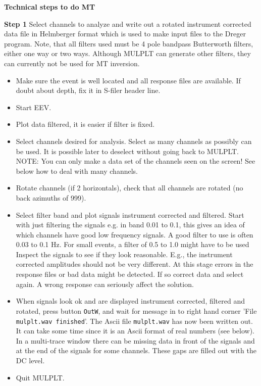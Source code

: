 \textbf{Technical steps to do MT}

\textbf{Step 1} Select channels to analyze and write out a rotated instrument corrected data file in Helmberger format which is used to make input files to the Dreger program. Note, that all filters used must be 4 pole bandpass Butterworth filters, either one way or two ways. Although MULPLT can generate other filters, they can currently not be used for MT inversion. 

\begin{itemize}
\item Make sure the event is well located and all response files are available. If doubt about depth, fix it in S-filer header line.
\item Start EEV.
\item Plot data filtered, it is easier if filter is fixed.
\item Select channels desired for analysis. Select as many channels as possibly can be used. It is possible later to deselect without going back to MULPLT. NOTE:  You can only make a data set of the channels seen on the screen! See below how to deal with many channels.
\item Rotate channels (if 2 horizontals), check that all channels are rotated (no back azimuths of 999).
\item Select filter band and plot signals instrument corrected and filtered. Start with just filtering the signals e.g. in band 0.01 to 0.1, this gives an idea of which channels have good low frequency signals. A good filter to use is often 0.03 to 0.1 Hz. For small events, a filter of 0.5 to 1.0 might have to be used  Inspect the signals to see if they look reasonable. E.g., the instrument corrected amplitudes should not be very different. At this stage errors in the response files or bad data might be detected. If so correct data and select again. A wrong response can seriously affect the solution.
\item When signals look ok and are displayed instrument corrected, filtered and rotated, press button \texttt{OutW}, and wait for message in to right hand corner 'File \texttt{mulplt.wav finished}'. The Ascii file \texttt{mulplt.wav} has now been written out. It can take some time since it is an Ascii format of real numbers (see below). In a multi-trace window there can be missing data in front of the signals and at the end of the signals for some channels. These gaps are filled out with the DC level.
\item Quit MULPLT. 
\end{itemize}

